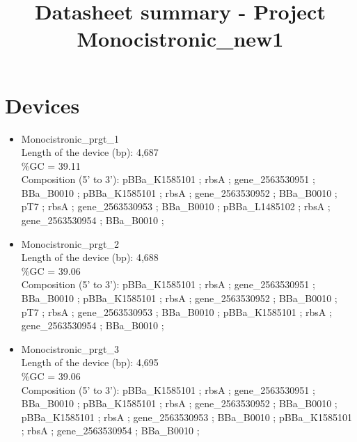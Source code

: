 \documentclass[12pt]{article}
\title{Datasheet summary - Project Monocistronic\_new1}
\begin{document}
\maketitle
\section{Devices}
\begin{itemize}
\item Monocistronic\_prgt\_1\\
Length of the device (bp): 4,687\\
\%GC = 39.11\\
Composition (5' to 3'): pBBa\_K1585101 ; rbsA ; gene\_2563530951 ; BBa\_B0010 ; pBBa\_K1585101
; rbsA ; gene\_2563530952 ; BBa\_B0010 ; pT7 ; rbsA ; gene\_2563530953
; BBa\_B0010 ; pBBa\_L1485102 ; rbsA ; gene\_2563530954 ; BBa\_B0010 ;
\\
\begin{minipage}[t]{\linewidth}
          \end{minipage}
\item Monocistronic\_prgt\_2\\
Length of the device (bp): 4,688\\
\%GC = 39.06\\
Composition (5' to 3'): pBBa\_K1585101 ; rbsA ; gene\_2563530951 ; BBa\_B0010 ; pBBa\_K1585101
; rbsA ; gene\_2563530952 ; BBa\_B0010 ; pT7 ; rbsA ; gene\_2563530953
; BBa\_B0010 ; pBBa\_K1585101 ; rbsA ; gene\_2563530954 ; BBa\_B0010 ;
\\
\begin{minipage}[t]{\linewidth}
          \end{minipage}
\item Monocistronic\_prgt\_3\\
Length of the device (bp): 4,695\\
\%GC = 39.06\\
Composition (5' to 3'): pBBa\_K1585101 ; rbsA ; gene\_2563530951 ; BBa\_B0010 ; pBBa\_K1585101
; rbsA ; gene\_2563530952 ; BBa\_B0010 ; pBBa\_K1585101 ; rbsA ;
gene\_2563530953 ; BBa\_B0010 ; pBBa\_K1585101 ; rbsA ;
gene\_2563530954 ; BBa\_B0010 ; \\
\begin{minipage}[t]{\linewidth}
          \end{minipage}
\end{itemize}
\end{document}
